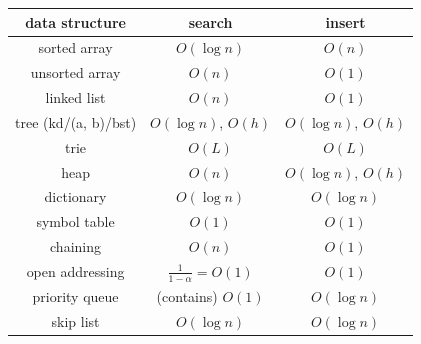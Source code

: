 \documentclass[10pt, landscape]{article}
\makeatletter
\newenvironment{tightcenter}{%
  \setlength\topsep{0pt}
  \setlength\parskip{0pt}
  \begin{center}
}{%
  \end{center}
}
\renewcommand{\section}{\@startsection{section}{1}{0mm}%
                                {-1ex plus -.5ex minus -.2ex}%
                                {0.5ex plus .2ex}%
                                {\normalfont\large\bfseries}}
\let\then\Rightarrow
\makeatother
\begin{document}
\begin{multicols}{4}
\begin{tightcenter}
\begin{tabular}{| c | c | c |}
    \textbf{data structure} & \textbf{search} & \textbf{insert}\\\hline
    sorted array & $O(\log n)$ & $O(n)$ \\\hline
    unsorted array & $O(n)$ & $O(1)$ \\\hline
    linked list & $O(n)$ & $O(1)$ \\\hline
    tree (kd/(a, b)/bst) & $O(\log n)$, $O(h)$ & $O(\log n)$, $O(h)$ \\\hline
    trie & $O(L)$ & $O(L)$ \\\hline
    heap & $O(n)$ & $O(\log n)$, $O(h)$ \\\hline
    dictionary & $O(\log n)$ & $O(\log n)$ \\\hline
    symbol table & $O(1)$ & $O(1)$ \\\hline
    chaining & $O(n)$ & $O(1)$ \\\hline
    open addressing & $\frac{1}{1-\alpha} = O(1)$ & $O(1)$ \\\hline
    priority queue & (contains) $O(1)$ & $O(\log n)$ \\\hline
    skip list & $O(\log n)$ & $O(\log n)$ \\\hline
\end{tabular}

\end{tightcenter}
\end{multicols}
\end{document}
